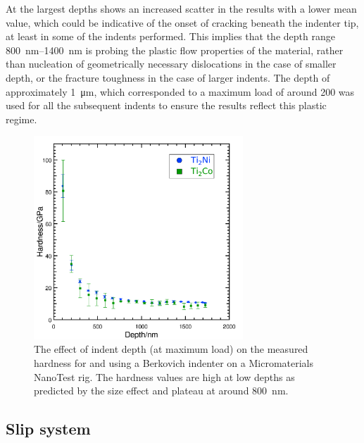 At the largest depths  shows an increased scatter in the results with a lower mean value, which could be indicative of the onset of cracking beneath the indenter tip, at least in some of the indents performed. This implies that the depth range \SIrange{800}{1400}{\nano\meter} is probing the plastic flow properties of the material, rather than nucleation of geometrically necessary dislocations in the case of smaller depth, or the fracture toughness in the case of larger indents. The depth of approximately \SI{1}{\micro\meter}, which corresponded to a maximum load of around \SI{200}{} was used for all the subsequent indents to ensure the results reflect this plastic regime.


\begin{figure}
\centering
\includegraphics[width=0.7\textwidth]{Depth_vs_Hardness_Ti2Ni}
\caption[The size effect on indentation in ]{The effect of indent depth (at maximum load) on the measured hardness for  and  using a Berkovich indenter on a Micromaterials NanoTest rig. The hardness values are high at low depths as predicted by the size effect \cite{Cripps2011} and plateau at around \SI{800}{\nano\meter}.\label{fig:Depth_vs_hardness_Ti2Ni}}
\end{figure}














\FloatBarrier
\subsection{Slip system}
\FloatBarrier




